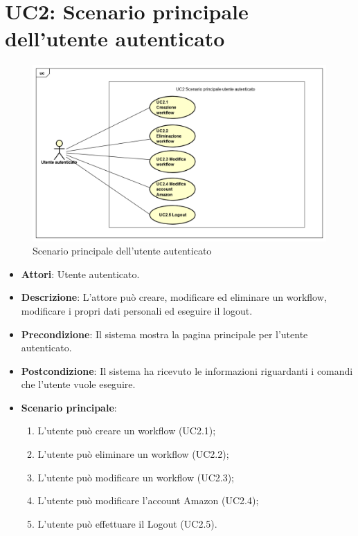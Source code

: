 \section{UC2: Scenario principale dell'utente autenticato}
\label{UC2}
\begin{figure} [h]
	\centering
	\includegraphics[scale=0.4]{./Diagram/UC2.png}
	\caption{Scenario principale dell'utente autenticato }\label{}
\end{figure}
\begin{itemize}
	\item \textbf{Attori}: Utente autenticato.
	\item \textbf{Descrizione}: L'attore può creare, modificare ed eliminare un workflow, modificare i propri dati personali ed eseguire il logout.
	\item \textbf{Precondizione}: Il sistema mostra la pagina principale per l'utente autenticato.
	\item \textbf{Postcondizione}: Il sistema ha ricevuto le informazioni riguardanti i comandi che l'utente vuole eseguire.
	\item \textbf{Scenario principale}:
	\begin{enumerate} \item L'utente può creare un workflow (UC2.1);  \item  L'utente può eliminare un workflow (UC2.2);  \item 
		L'utente può modificare un workflow (UC2.3);  \item  L'utente può modificare l'account Amazon (UC2.4);  \item 
		L'utente può effettuare il Logout (UC2.5).\end{enumerate}
\end{itemize}


